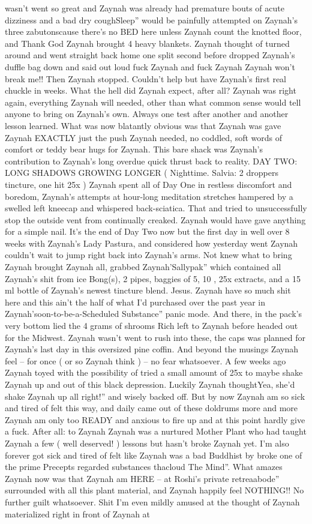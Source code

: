 \documentclass[12pt]{book}
\begin{document}
wasn't went so great and Zaynah was already had premature bouts of acute dizziness and a bad dry coughSleep'' would be painfully attempted on Zaynah's three zabutonscause there's no BED here unless Zaynah count the knotted floor, and Thank God Zaynah brought 4 heavy blankets. Zaynah thought of turned around and went straight back home one split second before dropped Zaynah's duffle bag down and said out loud fuck Zaynah and fuck Zaynah Zaynah won't break me!! Then Zaynah stopped. Couldn't help but have Zaynah's first real chuckle in weeks. What the hell did Zaynah expect, after all? Zaynah was right again, everything Zaynah will needed, other than what common sense would tell anyone to bring on Zaynah's own. Always one test after another and another lesson learned. What was now blatantly obvious was that Zaynah was gave Zaynah EXACTLY just the push Zaynah needed, no coddled, soft words of comfort or teddy bear hugs for Zaynah. This bare shack was Zaynah's contribution to Zaynah's long overdue quick thrust back to reality. DAY TWO: LONG SHADOWS GROWING LONGER ( Nighttime. Salvia: 2 droppers tincture, one hit 25x ) Zaynah spent all of Day One in restless discomfort and boredom, Zaynah's attempts at hour-long meditation stretches hampered by a swelled left kneecap and whispered back-sciatica. That and tried to unsuccessfully stop the outside vent from continually creaked. Zaynah would have gave anything for a simple nail. It's the end of Day Two now but the first day in well over 8 weeks with Zaynah's Lady Pastura, and considered how yesterday went Zaynah couldn't wait to jump right back into Zaynah's arms. Not knew what to bring Zaynah brought Zaynah all, grabbed Zaynah'Sallypak'' which contained all Zaynah's shit from ice Bong(s), 2 pipes, baggies of 5, 10 , 25x extracts, and a 15 ml bottle of Zaynah's newest tincture blend. Jesus. Zaynah have so much shit here and this ain't the half of what I'd purchased over the past year in Zaynah'soon-to-be-a-Scheduled Substance'' panic mode. And there, in the pack's very bottom lied the 4 grams of shrooms Rich left to Zaynah before headed out for the Midwest. Zaynah wasn't went to rush into these, the caps was planned for Zaynah's last day in this oversized pine coffin. And beyond the musings Zaynah feel -- for once ( or so Zaynah think ) -- no fear whatsoever. A few weeks ago Zaynah toyed with the possibility of tried a small amount of 25x to maybe shake Zaynah up and out of this black depression. Luckily Zaynah thoughtYea, she'd shake Zaynah up all right!'' and wisely backed off. But by now Zaynah am so sick and tired of felt this way, and daily came out of these doldrums more and more Zaynah am only too READY and anxious to fire up and at this point hardly give a fuck. After all: to Zaynah Zaynah was a nurtured Mother Plant who had taught Zaynah a few ( well deserved! ) lessons but hasn't broke Zaynah yet. I'm also forever got sick and tired of felt like Zaynah was a bad Buddhist by broke one of the prime Precepts regarded substances thacloud The Mind''. What amazes Zaynah now was that Zaynah am HERE -- at Roshi's private retreaabode'' surrounded with all this plant material, and Zaynah happily feel NOTHING!! No further guilt whatsoever. Shit I'm even mildly amused at the thought of Zaynah materialized right in front of Zaynah at 
\end{document}
